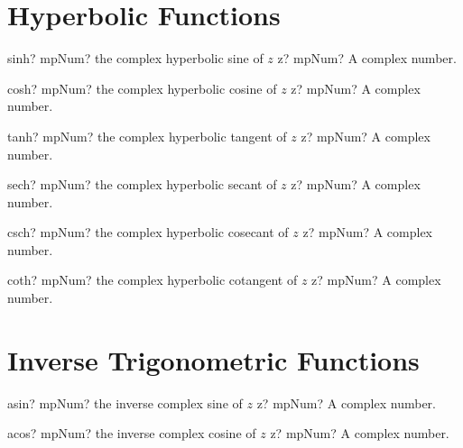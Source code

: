 \documentclass[12pt,a4paper,openany]{book}
\begin{document}
\section{Hyperbolic Functions}

\begin{mpFunctionsExtract}
\mpFunctionOne
{sinh? mpNum? the complex hyperbolic sine of $z$}
{z? mpNum? A complex number.}
\end{mpFunctionsExtract}

\begin{mpFunctionsExtract}
\mpFunctionOne
{cosh? mpNum? the complex hyperbolic cosine of $z$}
{z? mpNum? A complex number.}
\end{mpFunctionsExtract}

\begin{mpFunctionsExtract}
\mpFunctionOne
{tanh? mpNum? the complex hyperbolic tangent of $z$}
{z? mpNum? A complex number.}
\end{mpFunctionsExtract}

\begin{mpFunctionsExtract}
\mpFunctionOne
{sech? mpNum? the complex hyperbolic secant of $z$}
{z? mpNum? A complex number.}
\end{mpFunctionsExtract}

\begin{mpFunctionsExtract}
\mpFunctionOne
{csch? mpNum? the complex hyperbolic cosecant of $z$}
{z? mpNum? A complex number.}
\end{mpFunctionsExtract}

\begin{mpFunctionsExtract}
\mpFunctionOne
{coth? mpNum? the complex hyperbolic cotangent of $z$}
{z? mpNum? A complex number.}
\end{mpFunctionsExtract}

\section{Inverse Trigonometric Functions}

\begin{mpFunctionsExtract}
\mpFunctionOne
{asin? mpNum? the inverse complex sine of $z$}
{z? mpNum? A complex number.}
\end{mpFunctionsExtract}

\begin{mpFunctionsExtract}
\mpFunctionOne
{acos? mpNum? the inverse complex cosine of $z$}
{z? mpNum? A complex number.}
\end{mpFunctionsExtract}
\end{document}

